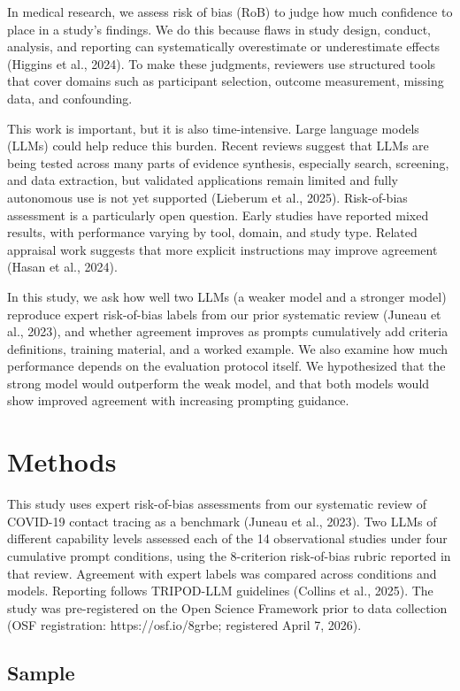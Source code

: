 \documentclass[11pt,a4paper]{article}
\begin{document}
In medical research, we assess risk of bias (RoB) to judge how much confidence to place in a study's findings. We do this because flaws in study design, conduct, analysis, and reporting can systematically overestimate or underestimate effects (Higgins et al., 2024). To make these judgments, reviewers use structured tools that cover domains such as participant selection, outcome measurement, missing data, and confounding.

This work is important, but it is also time-intensive. Large language models (LLMs) could help reduce this burden. Recent reviews suggest that LLMs are being tested across many parts of evidence synthesis, especially search, screening, and data extraction, but validated applications remain limited and fully autonomous use is not yet supported (Lieberum et al., 2025). Risk-of-bias assessment is a particularly open question. Early studies have reported mixed results, with performance varying by tool, domain, and study type. Related appraisal work suggests that more explicit instructions may improve agreement (Hasan et al., 2024).

In this study, we ask how well two LLMs (a weaker model and a stronger model) reproduce expert risk-of-bias labels from our prior systematic review (Juneau et al., 2023), and whether agreement improves as prompts cumulatively add criteria definitions, training material, and a worked example. We also examine how much performance depends on the evaluation protocol itself. We hypothesized that the strong model would outperform the weak model, and that both models would show improved agreement with increasing prompting guidance.

\section{Methods}

This study uses expert risk-of-bias assessments from our systematic review of COVID-19 contact tracing as a benchmark (Juneau et al., 2023). Two LLMs of different capability levels assessed each of the 14 observational studies under four cumulative prompt conditions, using the 8-criterion risk-of-bias rubric reported in that review. Agreement with expert labels was compared across conditions and models. Reporting follows TRIPOD-LLM guidelines (Collins et al., 2025). The study was pre-registered on the Open Science Framework prior to data collection (OSF registration: https://osf.io/8grbe; registered April 7, 2026).

\subsection{Sample}
\end{document}
